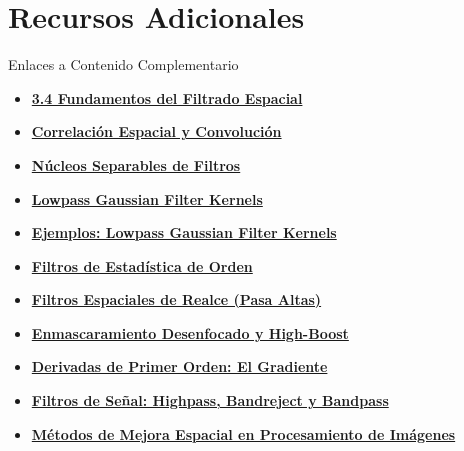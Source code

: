 \documentclass{beamer}
\begin{document}
\section{Recursos Adicionales}

\begin{frame}[fragile]{Enlaces a Contenido Complementario}
    \begin{itemize}
        \item \href{run:Tema_pag_150_p1.html}{\textbf{3.4 Fundamentos del Filtrado Espacial}}
        \item \href{run:Tema_3_4_pag_154_p1.html}{\textbf{Correlación Espacial y Convolución}}
        \item \href{run:Tema_3_4_pag_161_p1.html}{\textbf{Núcleos Separables de Filtros}}
        \item \href{run:Tema_3_4_pag_166_p1.html}{\textbf{Lowpass Gaussian Filter Kernels}}
        \item \href{run:Tema_3_4_pag_169_p1.html}{\textbf{Ejemplos: Lowpass Gaussian Filter Kernels}}
        \item \href{run:Tema_3_4_pag_174_p1.html}{\textbf{Filtros de Estadística de Orden}}
        \item \href{run:Tema_3_6_p1.html}{\textbf{Filtros Espaciales de Realce (Pasa Altas)}}
        \item \href{run:Tema_3_6_pag_182.html}{\textbf{Enmascaramiento Desenfocado y High-Boost}}
        \item \href{run:Tema_3_6_pag_184.html}{\textbf{Derivadas de Primer Orden: El Gradiente}}
        \item \href{run:Tema_3_7_pag_188.html}{\textbf{Filtros de Señal: Highpass, Bandreject y Bandpass}}
        \item \href{run:Tema_3_8_pag_191.html}{\textbf{Métodos de Mejora Espacial en Procesamiento de Imágenes}}
    \end{itemize}
\end{frame}
\end{document}
